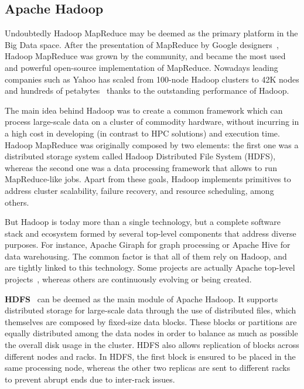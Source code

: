 \documentclass[3p,review]{elsarticle}
\begin{document}
\subsection{Apache Hadoop}\label{subsec:hadoop}

Undoubtedly Hadoop MapReduce may be deemed as the primary platform in the Big Data space. After the presentation of MapReduce by Google designers~\cite{dean04}, Hadoop MapReduce was grown by the community, and became the most used and powerful open-source implementation of MapReduce. Nowadays leading companies such as Yahoo has scaled from 100-node Hadoop clusters to 42K nodes and hundreds of petabytes~\cite{harris13} thanks to the outstanding performance of Hadoop. 

The main idea behind Hadoop was to create a common framework which can process large-scale data on a cluster of commodity hardware, without incurring in a high cost in developing (in contrast to HPC solutions) and execution time. Hadoop MapReduce was originally composed by two elements: the first one was a distributed storage system called Hadoop Distributed File System (HDFS), whereas the second one was a data processing framework that allows to run MapReduce-like jobs. Apart from these goals, Hadoop implements primitives to address cluster scalability, failure recovery, and resource scheduling, among others.

But Hadoop is today more than a single technology, but a complete software stack and ecosystem formed by several top-level components that address diverse purposes. For instance, Apache Giraph for graph processing or Apache Hive for data warehousing. The common factor is that all of them rely on Hadoop, and are tightly linked to this technology. Some projects are actually Apache top-level projects~\cite{apache}, whereas others are continuously evolving or being created.%

\textbf{HDFS}~\cite{hdfs} can be deemed as the main module of Apache Hadoop. It supports distributed storage for large-scale data through the use of distributed files, which themselves are composed by fixed-size data blocks. These blocks or partitions are equally distributed among the data nodes in order to balance as much as possible the overall disk usage in the cluster. HDFS also allows replication of blocks across different nodes and racks. In HDFS, the first block is ensured to be placed in the same processing node, whereas the other two replicas are sent to different racks to prevent abrupt ends due to inter-rack issues. 
\end{document}

